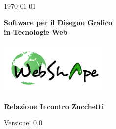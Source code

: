 
\title{\TITOLODOC}
\author{Bizzotto Piero}



\renewcommand{\insertversion}{0.0} %
\renewcommand{\TITOLODOC}{Relazione Incontro Zucchetti} %
\renewcommand{\glosspath}{.\glossario} %

\begin{titlepage}
\begin{center}
	\begin{Large}	\today \end{Large}
\end{center}

\vspace{20pt}

\begin{center}
	\begin{Huge}
				\textbf{\ajax}
	\end{Huge}
\end{center}			

\begin{center}
	\begin{large}
				\textbf{Software per il Disegno Grafico\\ in Tecnologie Web}
	\end{large}
\end{center}			

\vspace{20pt}

\begin{center}
\includegraphics[width=150pt]{../logo/logo}
\end{center}

\vspace{160pt}
\begin{center} %
	\begin{Huge}
				\textbf{\TITOLODOC}
	\end{Huge}
\end{center}
\vspace{210pt}
\begin{center}
Versione: \insertversion
\end{center}
\end{titlepage}

